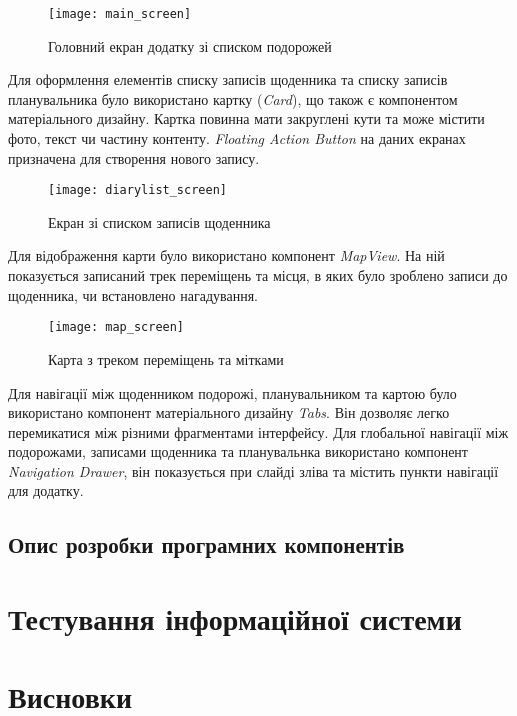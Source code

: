 \documentclass[../main.tex]{subfiles}
\begin{document}
\begin{figure}[H]
	\centering
	\texttt{[image: main\_screen]}
	\caption{Головний екран додатку зі списком подорожей}
	\label{figure:main_screen}
\end{figure}

Для оформлення елементів списку записів щоденника та списку записів планувальника було використано картку (\textit{Card}), що також є компонентом матеріального дизайну. Картка повинна мати закруглені кути та може містити фото, текст чи частину контенту. \textit{Floating Action Button} на даних екранах призначена для створення нового запису.

\begin{figure}[H]
	\centering
	\texttt{[image: diarylist\_screen]}
	\caption{Екран зі списком записів щоденника}
	\label{figure:diary_list_screen}
\end{figure}

Для відображення карти було використано компонент \textit{MapView}. На ній показується записаний трек переміщень та місця, в яких було зроблено записи до щоденника, чи встановлено нагадування.

\begin{figure}[H]
	\centering
	\texttt{[image: map\_screen]}
	\caption{Карта з треком переміщень та мітками}
	\label{figure:map_screen}
\end{figure}

Для навігації між щоденником подорожі, планувальником та картою було використано компонент матеріального дизайну \textit{Tabs}. Він дозволяє легко перемикатися між різними фрагментами інтерфейсу. Для глобальної навігації між подорожами, записами щоденника та планувальнка використано компонент \textit{Navigation Drawer}, він показується при слайді зліва та містить пункти навігації для додатку. 

\subsection{Опис розробки програмних компонентів}

\section{Тестування інформаційної системи}


\section{Висновки}

	
\end{document}

